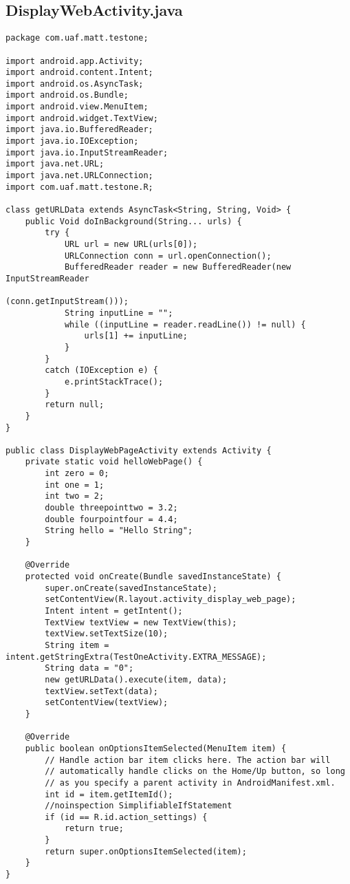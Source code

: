 \subsection{DisplayWebActivity.java}
\label{app:cawebactivity}
\begin{lstlisting}
package com.uaf.matt.testone;

import android.app.Activity;
import android.content.Intent;
import android.os.AsyncTask;
import android.os.Bundle;
import android.view.MenuItem;
import android.widget.TextView;
import java.io.BufferedReader;
import java.io.IOException;
import java.io.InputStreamReader;
import java.net.URL;
import java.net.URLConnection;
import com.uaf.matt.testone.R;

class getURLData extends AsyncTask<String, String, Void> {
    public Void doInBackground(String... urls) {
        try {
            URL url = new URL(urls[0]);
            URLConnection conn = url.openConnection();
            BufferedReader reader = new BufferedReader(new InputStreamReader
                                                          (conn.getInputStream()));
            String inputLine = "";
            while ((inputLine = reader.readLine()) != null) {
                urls[1] += inputLine;
            }
        }
        catch (IOException e) {
            e.printStackTrace();
        }
        return null;
    }
}

public class DisplayWebPageActivity extends Activity {
    private static void helloWebPage() {
        int zero = 0;
        int one = 1;
        int two = 2;
        double threepointtwo = 3.2;
        double fourpointfour = 4.4;
        String hello = "Hello String";
    }

    @Override
    protected void onCreate(Bundle savedInstanceState) {
        super.onCreate(savedInstanceState);
        setContentView(R.layout.activity_display_web_page);
        Intent intent = getIntent();
        TextView textView = new TextView(this);
        textView.setTextSize(10);
        String item = intent.getStringExtra(TestOneActivity.EXTRA_MESSAGE);
        String data = "0";
        new getURLData().execute(item, data);
        textView.setText(data);
        setContentView(textView);
    }

    @Override
    public boolean onOptionsItemSelected(MenuItem item) {
        // Handle action bar item clicks here. The action bar will
        // automatically handle clicks on the Home/Up button, so long
        // as you specify a parent activity in AndroidManifest.xml.
        int id = item.getItemId();
        //noinspection SimplifiableIfStatement
        if (id == R.id.action_settings) {
            return true;
        }
        return super.onOptionsItemSelected(item);
    }
}
\end{lstlisting}
